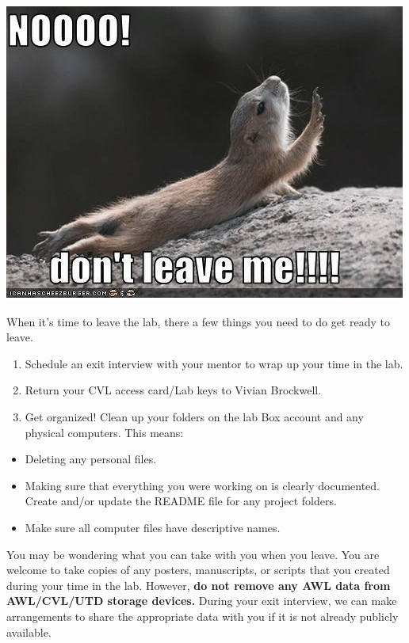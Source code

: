 \documentclass[]{book}
\providecommand{\tightlist}{%
  \setlength{\itemsep}{0pt}\setlength{\parskip}{0pt}}
\begin{document}
\includegraphics{images/leave.png}

When it's time to leave the lab, there a few things you need to do get ready to leave.

\begin{enumerate}
\def\labelenumi{(\arabic{enumi})}
\tightlist
\item
  Schedule an exit interview with your mentor to wrap up your time in the lab.
\item
  Return your CVL access card/Lab keys to Vivian Brockwell.
\item
  Get organized! Clean up your folders on the lab Box account and any physical computers. This means:
\end{enumerate}

\begin{itemize}
\tightlist
\item
  Deleting any personal files.
\item
  Making sure that everything you were working on is clearly documented. Create and/or update the README file for any project folders.
\item
  Make sure all computer files have descriptive names.
\end{itemize}

You may be wondering what you can take with you when you leave. You are welcome to take copies of any posters, manuscripts, or scripts that you created during your time in the lab. However, \textbf{do not remove any AWL data from AWL/CVL/UTD storage devices.} During your exit interview, we can make arrangements to share the appropriate data with you if it is not already publicly available.
\end{document}
